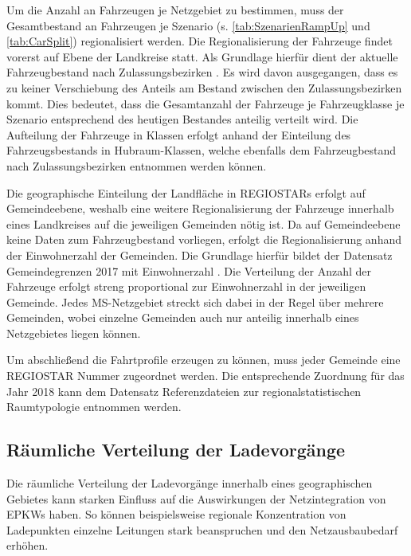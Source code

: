 Um die Anzahl an Fahrzeugen je Netzgebiet zu bestimmen, muss der Gesamtbestand an Fahrzeugen je Szenario (s. \autoref{tab:SzenarienRampUp} und \autoref{tab:CarSplit}) regionalisiert werden.
Die Regionalisierung der Fahrzeuge findet vorerst auf Ebene der Landkreise statt.
Als Grundlage hierfür dient der aktuelle Fahrzeugbestand nach Zulassungsbezirken \cite[][Stand: ]{KBAPLZ2020}.
Es wird davon ausgegangen, dass es zu keiner Verschiebung des Anteils am Bestand zwischen den Zulassungsbezirken kommt.
Dies bedeutet, dass die Gesamtanzahl der Fahrzeuge je Fahrzeugklasse je Szenario entsprechend des heutigen Bestandes anteilig verteilt wird.
Die Aufteilung der Fahrzeuge in Klassen erfolgt anhand der Einteilung des Fahrzeugsbestands in Hubraum-Klassen, welche ebenfalls dem Fahrzeugbestand nach Zulassungsbezirken entnommen werden können.\medskip

Die geographische Einteilung der Landfläche in \glspl{REGIOSTAR} erfolgt auf Gemeindeebene, weshalb eine weitere Regionalisierung der Fahrzeuge innerhalb eines Landkreises auf die jeweiligen Gemeinden nötig ist.
Da auf Gemeindeebene keine Daten zum Fahrzeugbestand vorliegen, erfolgt die Regionalisierung anhand der Einwohnerzahl der Gemeinden.
Die Grundlage hierfür bildet der Datensatz \glqq Gemeindegrenzen 2017 mit Einwohnerzahl\grqq{} \cite[][Stand: ]{EDG2020}.
Die Verteilung der Anzahl der Fahrzeuge erfolgt streng proportional zur Einwohnerzahl in der jeweiligen Gemeinde.
Jedes \gls{MS}-Netzgebiet streckt sich dabei in der Regel über mehrere Gemeinden, wobei einzelne Gemeinden auch nur anteilig innerhalb eines Netzgebietes liegen können.\medskip

Um abschließend die Fahrtprofile erzeugen zu können, muss jeder Gemeinde eine \gls{REGIOSTAR} Nummer zugeordnet werden.
Die entsprechende Zuordnung für das Jahr \num{2018} kann dem Datensatz \glqq Referenzdateien zur regionalstatistischen Raumtypologie\grqq{} \cite[][Stand: ]{BMVIa2020} entnommen werden.


\subsection{Räumliche Verteilung der Ladevorgänge}\label{chap:theo_distribution}

Die räumliche Verteilung der Ladevorgänge innerhalb eines geographischen Gebietes kann starken Einfluss auf die Auswirkungen der Netzintegration von \glspl{EPKW} haben.
So können beispielsweise regionale Konzentration von Ladepunkten einzelne Leitungen stark beanspruchen und den Netzausbaubedarf erhöhen.\medskip

